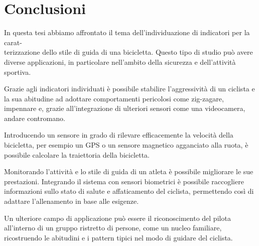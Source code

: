 \documentclass[class=article]{standalone}
\begin{document}
	\section{Conclusioni}
	In questa tesi abbiamo affrontato il tema dell'individuazione di indicatori per la carat-\\terizzazione dello stile di guida di una bicicletta. Questo tipo di studio può avere diverse applicazioni, in particolare nell'ambito della sicurezza e dell'attività sportiva.\hfill\break
	
	Grazie agli indicatori individuati è possibile stabilire l'aggressività di un ciclista e la sua abitudine ad adottare comportamenti pericolosi come zig-zagare, impennare e, grazie all'integrazione di ulteriori sensori come una videocamera, andare contromano.
	
	Introducendo un sensore in grado di rilevare efficacemente la velocità della bicicletta, per esempio un GPS o un sensore magnetico agganciato alla ruota, è possibile calcolare la traiettoria della bicicletta.
	
	Monitorando l'attività e lo stile di guida di un atleta è possibile migliorare le sue prestazioni. Integrando il sistema con sensori biometrici è possibile raccogliere informazioni sullo stato di salute e affaticamento del ciclista, permettendo così di adattare l'allenamento in base alle esigenze.
	
	Un ulteriore campo di applicazione può essere il riconoscimento del pilota all'interno di un gruppo ristretto di persone, come un nucleo familiare, ricostruendo le abitudini e i pattern tipici nel modo di guidare del ciclista.
\end{document}
